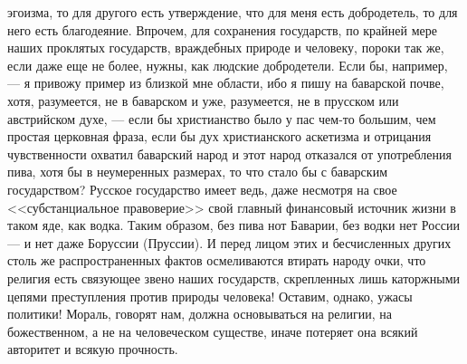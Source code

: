 \documentclass[12pt]{article}
\begin{document}
эгоизма, то для другого есть утверждение, что для меня есть добродетель, то для него есть благодеяние. Впрочем, для сохранения государств, по крайней мере наших проклятых государств, враждебных природе и человеку, пороки так же, если даже еще не более, нужны, как людские добродетели. Если бы, например, --- я привожу пример из близкой мне области, ибо я пишу на баварской почве, хотя, разумеется, не в баварском и уже, разумеется, не в прусском или австрийском духе, --- если бы христианство было у пас чем-то большим, чем простая церковная фраза, если бы дух христианского аскетизма и отрицания чувственности охватил баварский народ и этот народ отказался от употребления пива, хотя бы в неумеренных размерах, то что стало бы с баварским государством? Русское государство имеет ведь, даже несмотря на свое <<субстанциальное правоверие>>  свой главный финансовый источник жизни в таком яде, как водка. Таким образом, без пива нот Баварии, без водки нет России --- и нет даже Боруссии (Пруссии). И перед лицом этих и бесчисленных других столь же распространенных фактов осмеливаются втирать народу очки, что религия есть связующее звено наших государств, скрепленных лишь каторжными цепями преступления против природы человека! Оставим, однако, ужасы политики! Мораль, говорят нам, должна основываться на религии, на божественном, а не на человеческом существе, иначе потеряет она всякий авторитет и всякую прочность. 
\end{document}
